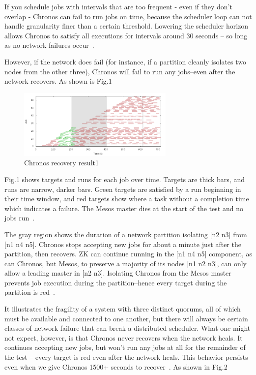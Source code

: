 \documentclass[letterpaper,twocolumn,10pt]{article}
\begin{document}
If you schedule jobs with intervals that are too frequent - even if they don’t overlap - Chronos can fail to run jobs on time, because the scheduler loop can not handle granularity finer than a certain threshold. Lowering the scheduler horizon allows Chronos to satisfy all executions for intervals around 30 seconds – so long as no network failures occur~\cite{Chronos}.

However, if the network does fail (for instance, if a partition cleanly isolates two nodes from the other three), Chronos will fail to run any jobs–even after the network recovers. As shown is Fig.1
\begin{figure}
\centering
\includegraphics[width=3in]{chronos1}
\caption{Chronos recovery result1}
\label{fig:my_label}
\end{figure}

Fig.1 shows targets and runs for each job over time. Targets are thick bars, and runs are narrow, darker bars. Green targets are satisfied by a run beginning in their time window, and red targets show where a task without a completion time which indicates a failure. The Mesos master dies at the start of the test and no jobs run~\cite{Chronos}.

The gray region shows the duration of a network partition isolating [n2 n3] from [n1 n4 n5]. Chronos stops accepting new jobs for about a minute just after the partition, then recovers. ZK can continue running in the [n1 n4 n5] component, as can Chronos, but Mesos, to preserve a majority of its nodes [n1 n2 n3], can only allow a leading master in [n2 n3]. Isolating Chronos from the Mesos master prevents job execution during the partition–hence every target during the partition is red~\cite{Chronos}.

It illustrates the fragility of a system with three distinct quorums, all of which must be available and connected to one another, but there will always be certain classes of network failure that can break a distributed scheduler. What one might not expect, however, is that Chronos never recovers when the network heals. It continues accepting new jobs, but won’t run any jobs at all for the remainder of the test – every target is red even after the network heals. This behavior persists even when we give Chronos 1500+ seconds to recover~\cite{Chronos}. As shown in Fig.2
\end{document}
